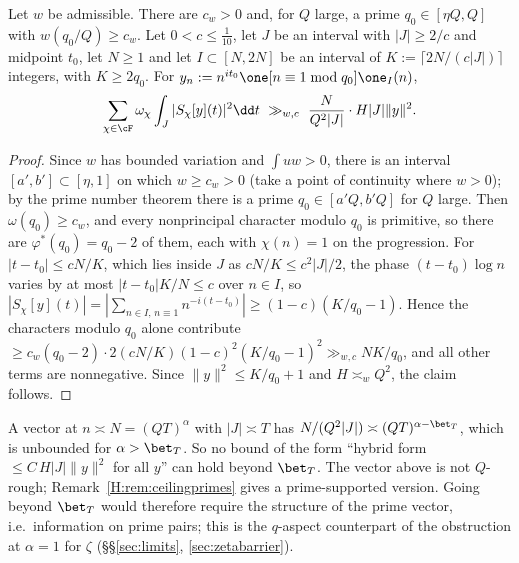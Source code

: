 \begin{proposition}\label{H:prop:ceiling}
Let $w$ be admissible. There are $c_w>0$ and, for $Q$ large, a prime $q_0\in[\eta Q,Q]$ with $w(q_0/Q)\ge c_w$. Let $0<c\le\frac1{10}$, let $J$ be an interval with $|J|\ge2/c$ and midpoint $t_0$, let $N\ge1$ and let $I\subset[N,2N]$ be an interval of $K:=\lceil2N/(c|J|)\rceil$ integers, with $K\ge2q_0$. For $y_n:=n^{it_0}\one[n\equiv1\bmod q_0]\one_I(n)$,
\[
\sum_{\chi\in\cF}\omega_\chi\int_J|S_\chi[y](t)|^2\dd t\ \gg_{w,c}\ \frac N{Q^2|J|}\cdot H|J|\|y\|^2 .
\]
\end{proposition}
\begin{proof}
Since $w$ has bounded variation and $\int uw>0$, there is an interval $[a',b']\subset[\eta,1]$ on which $w\ge c_w>0$ (take a point of continuity where $w>0$); by the prime number theorem there is a prime $q_0\in[a'Q,b'Q]$ for $Q$ large. Then $\omega(q_0)\ge c_w$, and every nonprincipal character modulo $q_0$ is primitive, so there are $\varphi^*(q_0)=q_0-2$ of them, each with $\chi(n)=1$ on the progression. For $|t-t_0|\le cN/K$, which lies inside $J$ as $cN/K\le c^2|J|/2$, the phase $(t-t_0)\log n$ varies by at most $|t-t_0|K/N\le c$ over $n\in I$, so $|S_\chi[y](t)|=|\sum_{n\in I,\,n\equiv1}n^{-i(t-t_0)}|\ge(1-c)(K/q_0-1)$. Hence the characters modulo $q_0$ alone contribute $\ge c_w(q_0-2)\cdot2(cN/K)(1-c)^2(K/q_0-1)^2\gg_{w,c}NK/q_0$, and all other terms are nonnegative. Since $\|y\|^2\le K/q_0+1$ and $H\asymp_wQ^2$, the claim follows.
\end{proof}

A vector at $n\asymp N=(QT)^\alpha$ with $|J|\asymp T$ has $N/(Q^2|J|)\asymp(QT)^{\alpha-\bet_T}$, which is unbounded for $\alpha>\bet_T$. So no bound of the form ``hybrid form $\le C\,H|J|\|y\|^2$ for all $y$'' can hold beyond $\bet_T$. The vector above is not $Q$-rough; Remark~\ref{H:rem:ceilingprimes} gives a prime-supported version. Going beyond $\bet_T$ would therefore require the structure of the prime vector, i.e.\ information on prime pairs; this is the $q$-aspect counterpart of the obstruction at $\alpha=1$ for $\zeta$ (\S\S\ref{sec:limits}, \ref{sec:zetabarrier}).

